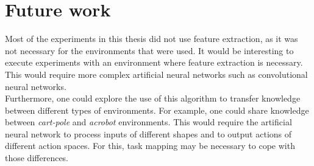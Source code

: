 \section{Future work} %
\label{sec:future_work}
Most of the experiments in this thesis did not use feature extraction, as it was not necessary for the environments that were used. It would be interesting to execute experiments with an environment where feature extraction is necessary. This would require more complex artificial neural networks such as convolutional neural networks.\\

Furthermore, one could explore the use of this algorithm to transfer knowledge between different types of environments. For example, one could share knowledge between \textit{cart-pole} and \textit{acrobot} environments. This would require the artificial neural network to process inputs of different shapes and to output actions of different action spaces. For this, task mapping may be necessary to cope with those differences.
